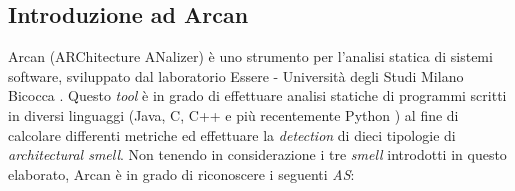     \subsection{Introduzione ad Arcan}
        Arcan (ARChitecture ANalizer) \cite{Arcan2017}\cite{Arcan2018} è uno strumento per l'analisi statica di sistemi software, sviluppato dal laboratorio Essere - Università degli Studi Milano Bicocca \cite{ESSeREwebsite}. Questo \textit{tool} è in grado di effettuare analisi statiche di programmi scritti in diversi linguaggi (Java, C, C++ e più recentemente Python \cite{stropeniPhdThesis}) al fine di calcolare differenti metriche ed effettuare la \textit{detection} di dieci tipologie di \textit{architectural smell}.  %
        Non tenendo in considerazione i tre \textit{smell} introdotti in questo elaborato, Arcan è in grado di riconoscere i seguenti \textit{AS}:
